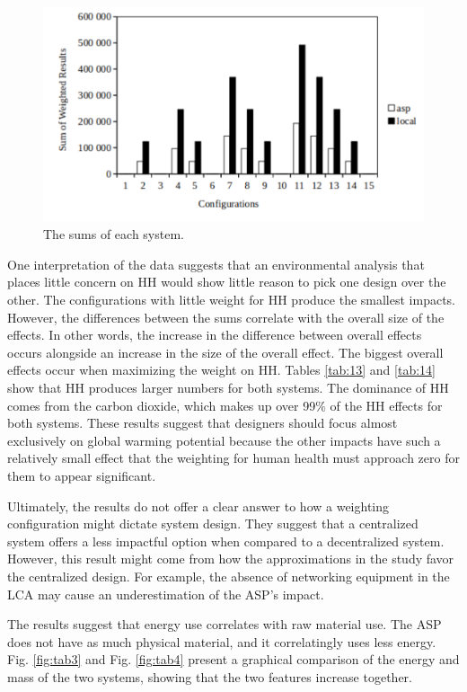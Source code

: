 \documentclass[final,journal,10pt,letterpaper,oneside,twocolumn,compsoc]%
{IEEEtran}
\begin{document}
\begin{figure}[t!]
  \centering
    \includegraphics[scale=0.55]{sums}
  \caption{The sums of each system.}
  \label{fig:tab2}
\end{figure}

One interpretation of the data suggests that an environmental analysis that
places little concern on HH would show little reason to
pick one design over the other. The configurations with little weight for HH
produce the smallest impacts. However, the differences between the sums
correlate with the
overall size of the effects. In other words, the increase in the difference
between overall effects
occurs alongside an increase in the size of the overall effect. The biggest
overall effects occur when maximizing the weight on HH. Tables
\ref{tab:13} and \ref{tab:14} show
that HH produces larger numbers for both systems. The dominance of
HH comes from the carbon dioxide, which makes up over 99\% of the
HH effects for both systems. These results suggest that
designers should focus almost exclusively on global warming potential because
the other impacts have such a relatively small effect that the weighting for
human health must approach zero for them to appear significant.

Ultimately, the results do not offer a clear answer to how a weighting
configuration might
dictate system design. They suggest that a centralized system offers
a less impactful option when compared to a decentralized system. However, this
result might come from how the approximations in the study favor
the centralized design. For example, the absence of networking equipment in the
LCA may cause an underestimation of the ASP's impact.

The results suggest
that energy use correlates with raw material use. The ASP does not have as much
physical material, and it correlatingly uses less energy. Fig. \ref{fig:tab3}
and Fig. \ref{fig:tab4} present a graphical comparison of the
energy and mass of the two systems, showing that the two features increase
together.
\end{document}
